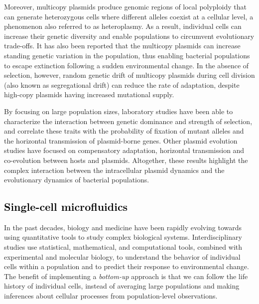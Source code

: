 \documentclass[fleqn,12pt]{wlscirep}
\newcommand{\blue}[1]{\textcolor{black}{#1}}
\begin{document}
Moreover, multicopy plasmids produce genomic regions of local polyploidy that can generate heterozygous cells where different alleles coexist at a cellular level, a phenomenon also referred to as heteroplasmy\cite{novick1987plasmid}. As a result, individual cells can increase their genetic diversity and enable populations to circumvent evolutionary trade-offs\cite{Rodriguez2018}.
It has also been reported that the multicopy plasmids can increase standing genetic variation in the population, thus enabling bacterial populations to escape extinction following a sudden environmental change\cite{santer2019evolutionary}. 
In the absence of selection, however, random genetic drift of multicopy plasmids during cell division (also known as segregational drift\cite{Ilhan2019}) can reduce the rate of adaptation, despite high-copy plasmids having increased mutational supply.

By focusing on large population sizes, laboratory studies have been able to characterize the interaction between genetic dominance and strength of selection, and correlate these traits with the probability of fixation of mutant alleles and the horizontal transmission of plasmid-borne genes\cite{rodriguez2019genetic}.
Other plasmid evolution studies have focused on compensatory adaptation\cite{SanMillan2014,Wein2019,hall2020extremely}, horizontal transmission\cite{Lopatkin2017} and co-evolution between hosts and plasmids\cite{Harrison2015}.
Altogether, these results highlight the complex interaction between the intracellular plasmid dynamics and the evolutionary dynamics of bacterial populations. 

\subsection{\blue{Single-cell microfluidics}}

In the past decades, biology and medicine have been rapidly evolving towards using quantitative tools to study complex biological systems. Interdisciplinary studies use statistical, mathematical, and computational tools, combined with experimental and molecular biology, to understand the behavior of individual cells within a population \cite{artemova2015isolated} and to predict their response to environmental change\cite{el2018heterogeneity}. The benefit of implementing a {\em bottom-up} approach is that we can follow the life history of individual cells, instead of averaging large populations and making inferences about cellular processes from population-level observations.
\end{document}

